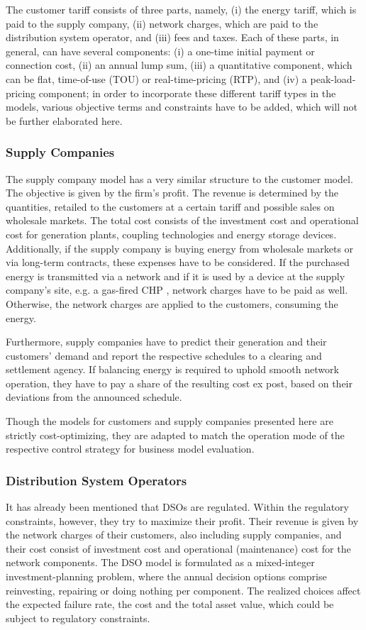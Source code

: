 \documentclass[a4paper,twoside]{article}
\begin{document}
The customer tariff consists of three parts, namely, (i) the energy
tariff, which is paid to the supply company, (ii) network charges,
which are paid to the distribution system operator, and (iii) fees and
taxes. Each of these parts, in general, can have several components:
(i) a one-time initial payment or connection cost, (ii) an annual lump
sum, (iii) a quantitative component, which can be flat, time-of-use (TOU) or real-time-pricing (RTP),
and (iv) a peak-load-pricing component; in order to incorporate these
different tariff types in the models, various objective terms and
constraints have to be added, which will not be further elaborated
here. 

\subsubsection{Supply Companies}
The supply company model has a very similar structure to the customer
model. The objective is given by the firm’s profit. The revenue is
determined by the quantities, retailed to the customers at a certain tariff
and possible sales on
wholesale markets.
The
total cost consists of the investment cost and operational cost for
generation plants, coupling technologies and energy storage
devices. Additionally, if the supply company is buying energy from
wholesale markets or via long-term contracts, these expenses have to
be considered. If the purchased energy is transmitted via a network
and if it is used by a device at the supply company’s site, e.g. a gas-fired CHP
, network charges have to be paid as well. Otherwise, the
network charges are applied to the customers, consuming the energy. 

Furthermore, supply companies have to predict their generation and
their customers’ demand and report the respective schedules to a
clearing and settlement agency. If balancing energy is required to
uphold smooth network operation, they have to pay a share of the
resulting cost ex post, based on their deviations from the announced
schedule. 

Though the models for customers and supply companies presented here
are strictly cost-optimizing, they are adapted to match the operation
mode of the respective control strategy for business model
evaluation. 

\subsubsection{Distribution System Operators}
It has already been mentioned that DSOs are regulated. Within the
regulatory constraints, however, they try to maximize their
profit. Their revenue is given by the network charges of their
customers, also including supply companies, and their cost consist of
investment cost and operational (maintenance) cost for the network
components. The DSO model is formulated as a mixed-integer
investment-planning problem, where the annual decision options
comprise reinvesting, repairing or doing nothing per component. The
realized choices affect the expected failure rate, the cost and the
total asset value, which could be subject to regulatory constraints. 
\end{document}
